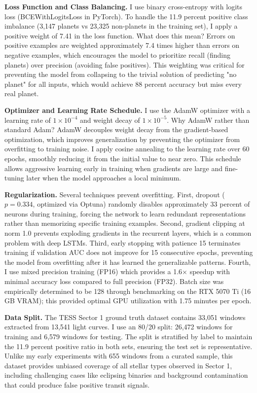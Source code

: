 \documentclass[letterpaper]{article} %
\begin{document}
\textbf{Loss Function and Class Balancing.} I use binary cross-entropy with logits loss (BCEWithLogitsLoss in PyTorch). To handle the 11.9 percent positive class imbalance (3,147 planets vs 23,325 non-planets in the training set), I apply a positive weight of 7.41 in the loss function. What does this mean? Errors on positive examples are weighted approximately 7.4 times higher than errors on negative examples, which encourages the model to prioritize recall (finding planets) over precision (avoiding false positives). This weighting was critical for preventing the model from collapsing to the trivial solution of predicting "no planet" for all inputs, which would achieve 88 percent accuracy but miss every real planet.

\textbf{Optimizer and Learning Rate Schedule.} I use the AdamW optimizer with a learning rate of $1 \times 10^{-4}$ and weight decay of $1 \times 10^{-5}$. Why AdamW rather than standard Adam? AdamW decouples weight decay from the gradient-based optimization, which improves generalization by preventing the optimizer from overfitting to training noise. I apply cosine annealing to the learning rate over 60 epochs, smoothly reducing it from the initial value to near zero. This schedule allows aggressive learning early in training when gradients are large and fine-tuning later when the model approaches a local minimum.

\textbf{Regularization.} Several techniques prevent overfitting. First, dropout ($p=0.334$, optimized via Optuna) randomly disables approximately 33 percent of neurons during training, forcing the network to learn redundant representations rather than memorizing specific training examples. Second, gradient clipping at norm 1.0 prevents exploding gradients in the recurrent layers, which is a common problem with deep LSTMs. Third, early stopping with patience 15 terminates training if validation AUC does not improve for 15 consecutive epochs, preventing the model from overfitting after it has learned the generalizable patterns. Fourth, I use mixed precision training (FP16) which provides a 1.6$\times$ speedup with minimal accuracy loss compared to full precision (FP32). Batch size was empirically determined to be 128 through benchmarking on the RTX 5070 Ti (16 GB VRAM); this provided optimal GPU utilization with 1.75 minutes per epoch.

\textbf{Data Split.} The TESS Sector 1 ground truth dataset contains 33,051 windows extracted from 13,541 light curves. I use an 80/20 split: 26,472 windows for training and 6,579 windows for testing. The split is stratified by label to maintain the 11.9 percent positive ratio in both sets, ensuring the test set is representative. Unlike my early experiments with 655 windows from a curated sample, this dataset provides unbiased coverage of all stellar types observed in Sector 1, including challenging cases like eclipsing binaries and background contamination that could produce false positive transit signals.
\end{document}
